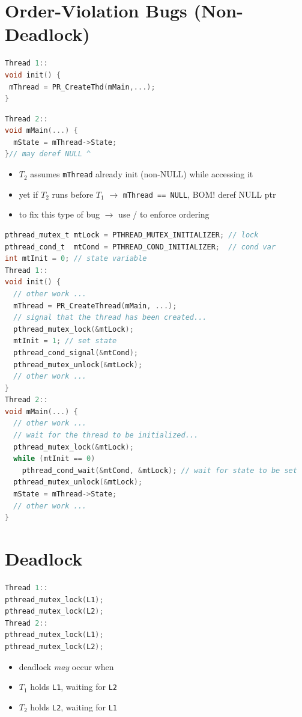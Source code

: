 \section*{Order-Violation Bugs (Non-Deadlock)}
\begin{minipage}{0.5\linewidth}
\begin{lstlisting}[language=c]
Thread 1::
void init() {
 mThread = PR_CreateThd(mMain,...);
}
\end{lstlisting}
\end{minipage}
\begin{minipage}{0.5\linewidth}
\begin{lstlisting}[language=c,xleftmargin=4pt]
Thread 2::
void mMain(...) {
  mState = mThread->State;
}// may deref NULL ^
\end{lstlisting}
\end{minipage}
\begin{itemize}
\item $T_2$ assumes \texttt{mThread} already init (non-NULL) while accessing it
\item yet if $T_2$ runs before $T_1$ $\to$ \texttt{mThread == NULL}, BOM! deref NULL ptr
\item to fix this type of bug $\to$ use / to enforce ordering
\end{itemize}
\begin{lstlisting}[language=c]
pthread_mutex_t mtLock = PTHREAD_MUTEX_INITIALIZER; // lock
pthread_cond_t  mtCond = PTHREAD_COND_INITIALIZER;  // cond var
int mtInit = 0; // state variable
Thread 1::
void init() {
  // other work ...
  mThread = PR_CreateThread(mMain, ...);
  // signal that the thread has been created...
  pthread_mutex_lock(&mtLock);
  mtInit = 1; // set state
  pthread_cond_signal(&mtCond);
  pthread_mutex_unlock(&mtLock);
  // other work ...
}
Thread 2::
void mMain(...) {
  // other work ...
  // wait for the thread to be initialized...
  pthread_mutex_lock(&mtLock);
  while (mtInit == 0)
    pthread_cond_wait(&mtCond, &mtLock); // wait for state to be set
  pthread_mutex_unlock(&mtLock);
  mState = mThread->State;
  // other work ...
}
\end{lstlisting}
\begin{minipage}{0.5\linewidth}
  \section*{Deadlock}
\begin{lstlisting}[language=c,frame=lines]
Thread 1::
pthread_mutex_lock(L1);
pthread_mutex_lock(L2);
Thread 2::
pthread_mutex_lock(L1);
pthread_mutex_lock(L2);
\end{lstlisting}
  \flushleft
  \begin{itemize}
  \item deadlock \emph{may} occur when
  \item $T_1$ holds \texttt{L1}, waiting for \texttt{L2}
  \item $T_2$ holds \texttt{L2}, waiting for \texttt{L1}
  \end{itemize}
\end{minipage}
